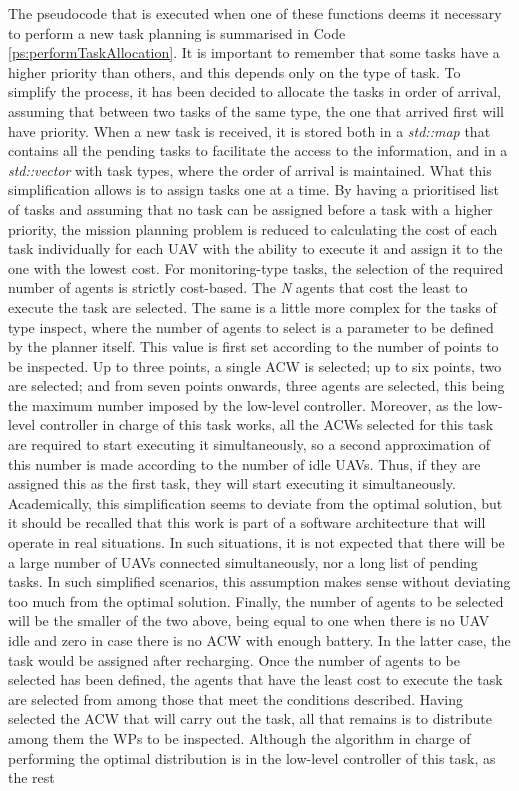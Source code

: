 The pseudocode that is executed when one of these functions deems it necessary to perform a new task planning is summarised in Code \ref{ps:performTaskAllocation}. It is important to remember that some tasks have a higher priority than others, and this depends only on the type of task. To simplify the process, it has been decided to allocate the tasks in order of arrival, assuming that between two tasks of the same type, the one that arrived first will have priority. When a new task is received, it is stored both in a \emph{std::map} that contains all the pending tasks to facilitate the access to the information, and in a \emph{std::vector} with task types, where the order of arrival is maintained. What this simplification allows is to assign tasks one at a time. By having a prioritised list of tasks and assuming that no task can be assigned before a task with a higher priority, the mission planning problem is reduced to calculating the cost of each task individually for each \gls{UAV} with the ability to execute it and assign it to the one with the lowest cost. For monitoring-type tasks, the selection of the required number of agents is strictly cost-based. The \emph{N} agents that cost the least to execute the task are selected. The same is a little more complex for the tasks of type inspect, where the number of agents to select is a parameter to be defined by the planner itself. This value is first set according to the number of points to be inspected. Up to three points, a single \gls{ACW} is selected; up to six points, two are selected; and from seven points onwards, three agents are selected, this being the maximum number imposed by the low-level controller. Moreover, as the low-level controller in charge of this task works, all the \glspl{ACW} selected for this task are required to start executing it simultaneously, so a second approximation of this number is made according to the number of idle \glspl{UAV}. Thus, if they are assigned this as the first task, they will start executing it simultaneously. Academically, this simplification seems to deviate from the optimal solution, but it should be recalled that this work is part of a software architecture that will operate in real situations. In such situations, it is not expected that there will be a large number of \glspl{UAV} connected simultaneously, nor a long list of pending tasks. In such simplified scenarios, this assumption makes sense without deviating too much from the optimal solution. Finally, the number of agents to be selected will be the smaller of the two above, being equal to one when there is no \gls{UAV} idle and zero in case there is no \gls{ACW} with enough battery. In the latter case, the task would be assigned after recharging. Once the number of agents to be selected has been defined, the agents that have the least cost to execute the task are selected from among those that meet the conditions described. Having selected the \gls{ACW} that will carry out the task, all that remains is to distribute among them the \glspl{WP} to be inspected. Although the algorithm in charge of performing the optimal distribution is in the low-level controller of this task, as the rest 